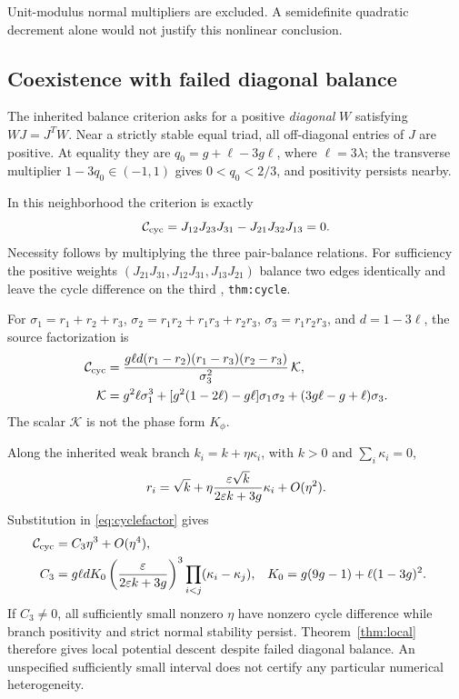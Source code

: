 Unit-modulus normal multipliers are excluded. A semidefinite quadratic decrement alone would not justify this nonlinear conclusion.

\subsection{Coexistence with failed diagonal balance}
The inherited balance criterion asks for a positive \emph{diagonal} \(W\) satisfying \(WJ=J^TW\). Near a strictly stable equal triad, all off-diagonal entries of \(J\) are positive. At equality they are \(q_0=g+\ell-3g\ell\), where \(\ell=3\lambda\); the transverse multiplier \(1-3q_0\in(-1,1)\) gives \(0<q_0<2/3\), and positivity persists nearby.

In this neighborhood the criterion is exactly
\begin{equation}
\mathcal C_{\rm cyc}=J_{12}J_{23}J_{31}-J_{21}J_{32}J_{13}=0.
\label{eq:cyclecriterion}
\end{equation}
Necessity follows by multiplying the three pair-balance relations. For sufficiency the positive weights
\((J_{21}J_{31},J_{12}J_{31},J_{13}J_{21})\) balance two edges identically and leave the cycle difference on the third \cite{nrg}, \texttt{thm:cycle}.

For \(\sigma_1=r_1+r_2+r_3\), \(\sigma_2=r_1r_2+r_1r_3+r_2r_3\), \(\sigma_3=r_1r_2r_3\), and \(d=1-3\ell\), the source factorization is
\begin{align}
\mathcal C_{\rm cyc}
&=\frac{g\ell d(r_1-r_2)(r_1-r_3)(r_2-r_3)}{\sigma_3^2}\,\mathcal K,
\label{eq:cyclefactor}\\
\mathcal K
&=g^2\ell\sigma_1^3+[g^2(1-2\ell)-g\ell]\sigma_1\sigma_2
+(3g\ell-g+\ell)\sigma_3.\notag
\end{align}
The scalar \(\mathcal K\) is not the phase form \(K_\phi\).

Along the inherited weak branch \(k_i=k+\eta\kappa_i\), with \(k>0\) and \(\sum_i\kappa_i=0\),
\[
r_i=\sqrt{k}+\eta\frac{\varepsilon\sqrt{k}}{2\varepsilon k+3g}\kappa_i+O(\eta^2).
\]
Substitution in \eqref{eq:cyclefactor} gives
\begin{align}
\mathcal C_{\rm cyc}&=C_3\eta^3+O(\eta^4),\notag\\
C_3&=g\ell dK_0\left(\frac{\varepsilon}{2\varepsilon k+3g}\right)^3
\prod_{i<j}(\kappa_i-\kappa_j),&
K_0&=g(9g-1)+\ell(1-3g)^2.
\label{eq:weakcycle}
\end{align}
If \(C_3\ne0\), all sufficiently small nonzero \(\eta\) have nonzero cycle difference while branch positivity and strict normal stability persist. Theorem~\ref{thm:local} therefore gives local potential descent despite failed diagonal balance. An unspecified sufficiently small interval does not certify any particular numerical heterogeneity.

